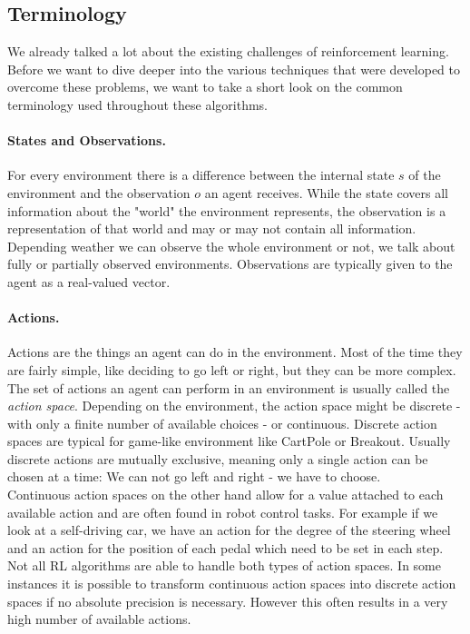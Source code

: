 \subsection{Terminology} \label{ssec:rlterms}
We already talked a lot about the existing challenges of reinforcement learning. Before we want to dive deeper into the various techniques that were developed to overcome these problems, we want to take a short look on the common terminology used throughout these algorithms.

\paragraph{States and Observations.}
For every environment there is a difference between the internal state $s$ of the environment and the observation $o$ an agent receives. While the state covers all information about the "world" the environment represents, the observation is a representation of that world and may or may not contain all information. Depending weather we can observe the whole environment or not, we talk about fully or partially observed environments. Observations are typically given to the agent as a real-valued vector. 

\paragraph{Actions.}
Actions are the things an agent can do in the environment. Most of the time they are fairly simple, like deciding to go left or right, but they can be more complex. \\
The set of actions an agent can perform in an environment is usually called the \textit{action space}. Depending on the environment, the action space might be discrete - with only a finite number of available choices - or continuous. Discrete action spaces are typical for game-like environment like CartPole or Breakout. Usually discrete actions are mutually exclusive, meaning only a single action can be chosen at a time: We can not go left and right - we have to choose. \\
Continuous action spaces on the other hand allow for a value attached to each available action and are often found in robot control tasks. For example if we look at a self-driving car, we have an action for the degree of the steering wheel and an action for the position of each pedal which need to be set in each step. \\
Not all RL algorithms are able to handle both types of action spaces. In some instances it is possible to transform continuous action spaces into discrete action spaces if no absolute precision is necessary. However this often results in a very high number of available actions.


